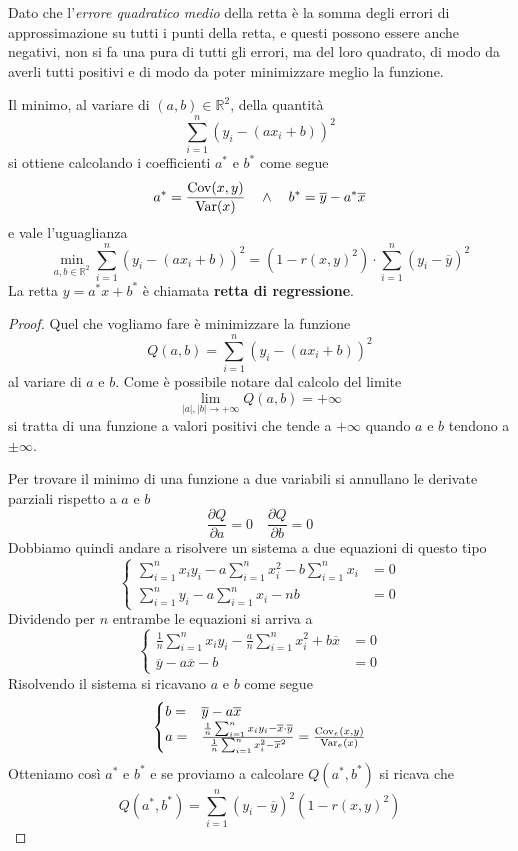 Dato che l'\emph{errore quadratico medio} della retta è la somma degli errori di approssimazione
su tutti i punti della retta, e questi possono essere anche negativi, non si fa una pura di tutti
gli errori, ma del loro quadrato, di modo da averli tutti positivi e di modo da poter minimizzare
meglio la funzione.

\begin{theorem}
	Il minimo, al variare di $(a, b) \in \mathbb{R}^2$, della quantità
	\[ \sum_{i=1}^n (y_i - (a x_i + b))^2 \]
	si ottiene calcolando i coefficienti $a^*$ e $b^*$ come segue
	\[ a^* = \frac{\operatorname{Cov}(x, y)}{\operatorname{Var}(x)} \quad \wedge \quad b^* = \overline{y} - a^* \overline{x} \]
	e vale l'uguaglianza
	\[
		\min_{a, b \in \mathbb{R}^2} \sum_{i=1}^n (y_i - (a x_i + b))^2 =
		(1 - r(x, y)^2) \cdot \sum_{i=1}^n (y_i - \overline{y})^2
	\]
	La retta $y = a^* x + b^*$ è chiamata \textbf{retta di regressione}.
	\begin{proof}
		Quel che vogliamo fare è minimizzare la funzione
		\[ Q(a, b) = \sum_{i=1}^n (y_i - (a x_i + b))^2 \]
		al variare di $a$ e $b$. Come è possibile notare dal calcolo del limite
		\[ \lim_{|a|, |b| \to +\infty} Q(a, b) = +\infty \]
		si tratta di una funzione a valori positivi che tende a $+\infty$ quando $a$ e $b$
		tendono a
		$\pm\infty$.

		Per trovare il minimo di una funzione a due variabili si annullano le derivate parziali
		rispetto a $a$ e $b$
		\[ \frac{\partial Q}{\partial a} = 0 \quad \frac{\partial Q}{\partial b} = 0 \]
		Dobbiamo quindi andare a risolvere un sistema a due equazioni di questo tipo
		\[
			\begin{cases}
				\sum_{i=1}^n x_i y_i - a \sum_{i=1}^n x_i^2 - b \sum_{i=1}^n x_i & = 0 \\
				\sum_{i=1}^n y_i - a \sum_{i=1}^n x_i - n b                      & = 0
			\end{cases}
		\]
		Dividendo per $n$ entrambe le equazioni si arriva a
		\[
			\begin{cases}
				\frac{1}{n} \sum_{i=1}^n x_i y_i - \frac{a}{n} \sum_{i=1}^n x_i^2 +
				b \overline{x}                    & = 0 \\
				\overline{y} - a \overline{x} - b & = 0
			\end{cases}
		\]
		Risolvendo il sistema si ricavano $a$ e $b$ come segue
		\[
			\begin{cases}
				b = & \overline{y} - a \overline{x}            \\
				a = & \frac{\frac{1}{n} \sum_{i=1}^n x_i y_i -
					\overline{x} \cdot \overline{y}}
				{\frac{1}{n} \sum_{i=1}^n x_i^2 - \overline{x}^2} =
				\frac{\operatorname{Cov}_e(x, y)}{\operatorname{Var}_e(x)}
			\end{cases}
		\]
		Otteniamo così $a^*$ e $b^*$ e se proviamo a calcolare $Q(a^*, b^*)$ si ricava che
		\[ Q(a^*, b^*) = \sum_{i=1}^n (y_i - \overline{y})^2 (1 - r(x, y)^2) \]
	\end{proof}
\end{theorem}

